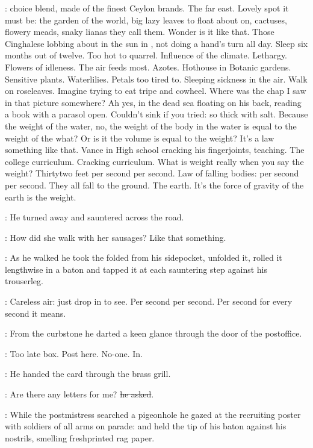 \BloomInt:
choice blend, made of the finest Ceylon brands.
The far east.
Lovely spot it must be:
the garden of the world,
big lazy leaves to float about on,
cactuses, flowery meads,
snaky lianas they call them.
Wonder is it like that.
Those Cinghalese lobbing about in the sun in ,
not doing a hand's turn all day.
Sleep six months out of twelve.
Too hot to quarrel.
Influence of the climate.
Lethargy.
Flowers of idleness.
The air feeds most.
Azotes.
Hothouse in Botanic gardens.
Sensitive plants.
Waterlilies.
Petals too tired to.
Sleeping sickness in the air.
Walk on roseleaves.
Imagine trying to eat tripe and cowheel.
Where was the chap I saw in that picture somewhere?
Ah yes, in the dead sea floating on his back,
reading a book with a parasol open.
Couldn't sink if you tried:
so thick with salt.
Because the weight of the water,
no, the weight of the
body in the water
is equal to the weight of the what?
Or is it the volume
is equal to the weight?
It's a law something like that.
Vance in High school cracking his fingerjoints, teaching.
The college curriculum.
Cracking curriculum.
What is weight really when you say the weight?
Thirtytwo feet per second per second.
Law of falling bodies:
per second per second.
They all fall to the ground.
The earth.
It's the force of gravity of the earth
is the weight.

:
He turned away and sauntered across the road.

\BloomInt:
How did she walk with her sausages?
Like that something.

:
As he walked he took the folded  from his sidepocket,
unfolded it, rolled it lengthwise in a baton
and tapped it at each sauntering step against his trouserleg.

\BloomInt:
Careless air: just drop in to see.
Per second per second.
Per second for every second
it means.

:
From the curbstone
he darted a keen glance through the door of the postoffice.

\BloomInt:
Too late box.
Post here.
No-one.
In.

:
He handed the card through the brass grill.

\Bloom:
Are there any letters for me?
\sout{he asked}.

:
While the postmistress searched a pigeonhole
he gazed at the recruiting poster with soldiers of all arms on parade:
and held the tip of his baton against his nostrils,
smelling freshprinted rag paper.


